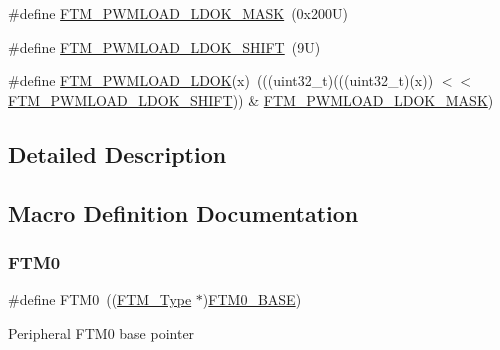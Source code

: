 \begin{DoxyCompactItemize}
\item 
\#define \mbox{\hyperlink{group___f_t_m___register___masks_ga3e984a537814ee8e4130be4e822671d4}{F\+T\+M\+\_\+\+P\+W\+M\+L\+O\+A\+D\+\_\+\+L\+D\+O\+K\+\_\+\+M\+A\+SK}}~(0x200\+U)
\item 
\#define \mbox{\hyperlink{group___f_t_m___register___masks_ga17e018e9c7812e93d45434bd8db18634}{F\+T\+M\+\_\+\+P\+W\+M\+L\+O\+A\+D\+\_\+\+L\+D\+O\+K\+\_\+\+S\+H\+I\+FT}}~(9\+U)
\item 
\#define \mbox{\hyperlink{group___f_t_m___register___masks_gaa6f91a65a92615804b5d162801bb5933}{F\+T\+M\+\_\+\+P\+W\+M\+L\+O\+A\+D\+\_\+\+L\+D\+OK}}(x)~(((uint32\+\_\+t)(((uint32\+\_\+t)(x)) $<$$<$ \mbox{\hyperlink{group___f_t_m___register___masks_ga17e018e9c7812e93d45434bd8db18634}{F\+T\+M\+\_\+\+P\+W\+M\+L\+O\+A\+D\+\_\+\+L\+D\+O\+K\+\_\+\+S\+H\+I\+FT}})) \& \mbox{\hyperlink{group___f_t_m___register___masks_ga3e984a537814ee8e4130be4e822671d4}{F\+T\+M\+\_\+\+P\+W\+M\+L\+O\+A\+D\+\_\+\+L\+D\+O\+K\+\_\+\+M\+A\+SK}})
\end{DoxyCompactItemize}


\subsection{Detailed Description}


\subsection{Macro Definition Documentation}
\mbox{\label{group___f_t_m___register___masks_gac20d96b96f80ded87aa187f7519699ee}} 
\subsubsection{\texorpdfstring{F\+T\+M0}{FTM0}}
{\footnotesize\ttfamily \#define F\+T\+M0~((\mbox{\hyperlink{struct_f_t_m___type}{F\+T\+M\+\_\+\+Type}} $\ast$)\mbox{\hyperlink{group___f_t_m___register___masks_ga2ababc70fbf6b51c721d870fa1c66e45}{F\+T\+M0\+\_\+\+B\+A\+SE}})}

Peripheral F\+T\+M0 base pointer \mbox{\label{group___f_t_m___register___masks_ga2ababc70fbf6b51c721d870fa1c66e45}} 
